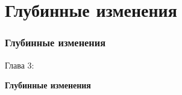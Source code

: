 %

\section{Глубинные изменения}
\begin{frame}[fragile]
	\frametitle{Глубинные изменения}

	\begin{center}\huge{Глава 3:}\end{center}
	\begin{center}\huge{\color{typo3darkgrey}\textbf{Глубинные изменения}}\end{center}

\end{frame}


